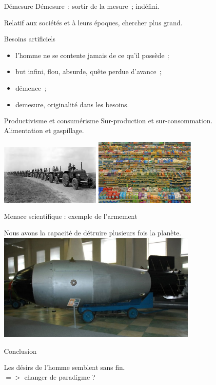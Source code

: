 \documentclass{beamer}
\begin{document}
\begin{frame}{Démesure}
  Démesure~: sortir de la mesure~; indéfini.

  Relatif aux sociétés et à leurs époques, chercher plus grand.
\end{frame}

\begin{frame}{Besoins artificiels}
  \begin{itemize}
    \item l'homme ne se contente jamais de ce qu'il possède~;
    \item but infini, flou, absurde, quête perdue d'avance~;
    \item démence~;
    \item demesure, originalité dans les besoins.
  \end{itemize}
\end{frame}

\begin{frame}{Productivisme et consumérisme}
  Sur-production et sur-consommation.
  Alimentation et gaspillage.
  \begin{center}
    \includegraphics[width=5cm]{../Images/urss.png}
    \includegraphics[width=5cm]{../Images/productivisme.jpeg}
	\end{center}
\end{frame}

\begin{frame}{Menace scientifique : exemple de l'armement}
  \begin{center}
    Nous avons la capacité de détruire plusieurs fois la planète.
    \includegraphics[width=10cm]{../Images/bombe.jpg}
  \end{center}

\end{frame}

\begin{frame}{Conclusion}
  \begin{center}
    Les désirs de l'homme semblent sans fin. \\
    $=>$ changer de paradigme ?

  \end{center}

\end{frame}
\end{document}

